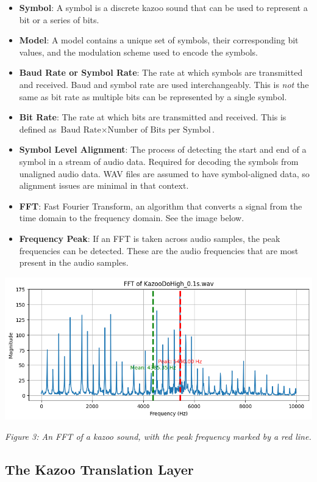 \documentclass[]{article}
\begin{document}
\begin{itemize}
  \item \textbf{Symbol}: A symbol is a discrete kazoo sound that can be used to represent a bit or a series of bits.
  \item \textbf{Model}: A model contains a unique set of symbols, their corresponding bit values, and the modulation scheme used to encode the symbols.
  \item \textbf{Baud Rate or Symbol Rate}: The rate at which symbols are transmitted and received. Baud and symbol rate are used interchangeably. This is \textit{not} the same as bit rate as multiple bits can be represented by a single symbol.
  \item \textbf{Bit Rate}: The rate at which bits are transmitted and received. This is defined as $\text{Baud Rate} \times \text{Number of Bits per Symbol}$.
  \item \textbf{Symbol Level Alignment}: The process of detecting the start and end of a symbol in a stream of audio data. Required for decoding the symbols from unaligned audio data. WAV files are assumed to have symbol-aligned data, so alignment issues are minimal in that context.
  \item \textbf{FFT}: Fast Fourier Transform, an algorithm that converts a signal from the time domain to the frequency domain. See the image below.
  \item \textbf{Frequency Peak}: If an FFT is taken across audio samples, the peak frequencies can be detected. These are the audio frequencies that are most present in the audio samples.
\end{itemize}

\begin{center}
  \includegraphics[width=0.7\linewidth]{images/fft.png}

  \textit{Figure 3: An FFT of a kazoo sound, with the peak frequency marked by a red line.}
\end{center}

\subsection{The Kazoo Translation Layer}
\end{document}
